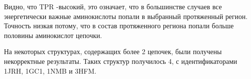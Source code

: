 Видно, что TPR -высокий, это означает, что в большинстве случаев все энергетически важные аминокислоты попали в выбранный протяженный регион. Точность низкая потому, что в состав протяженного региона попали больше половины аминокислот цепочки.

На некоторых структурах, содержащих более 2 цепочек, были получены некорректные результаты. Таких структур получилось 4, с идентификаторами 1JRH, 1GC1, 1NMB и 3HFM. %
